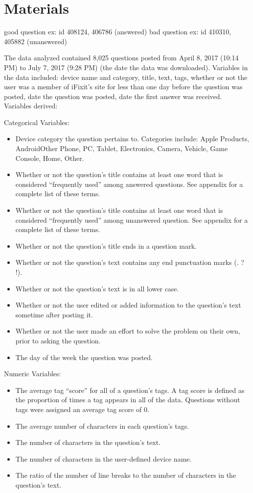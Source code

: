 \documentclass[12pt]{article}
\begin{document}
\section{Materials}

good question ex: id 408124, 406786 (answered)
bad question ex: id 410310, 405882 (unanswered) 

The data analyzed contained 8,025 questions posted from April 8, 2017 (10:14 PM) to July 7, 2017 (9:28 PM) (the date the data was downloaded). Variables in the data included: device name and category, title, text, tags, whether or not the user was a member of iFixit's site for less than one day before the question was posted, date the question was posted, date the first answer was received. Variables derived: 

Categorical Variables: 

\begin{itemize}
  \item Device category the question pertains to. Categories include: Apple Products, Android\/Other Phone, PC, Tablet, Electronics, Camera, Vehicle, Game Console, Home, Other.
  \item Whether or not the question's title contains at least one word that is considered ``frequently used'' among answered questions. See appendix for a complete list of these terms. 
  \item Whether or not the question's title contains at least one word that is considered ``frequently used'' among unanswered question. See appendix for a complete list of these terms. 
  \item Whether or not the question's title ends in a question mark.
  \item Whether or not the question's text contains any end punctuation marks (. ? !). 
  \item Whether or not the question's text is in all lower case. 
  \item Whether or not the user edited or added information to the question's text sometime after posting it.
  \item Whether or not the user made an effort to solve the problem on their own, prior to asking the question.
  \item The day of the week the question was posted. 
\end{itemize}

Numeric Variables:

\begin{itemize}
  \item The average tag ``score'' for all of a question's tags. A tag score is defined as the proportion of times a tag appears in all of the data. Questions without tags were assigned an average tag score of 0. 
  \item The average number of characters in each question's tags. 
  \item The number of characters in the question's text. 
  \item The number of characters in the user-defined device name. 
  \item The ratio of the number of line breaks to the number of characters in the question's text.
\end{itemize}
\end{document}
